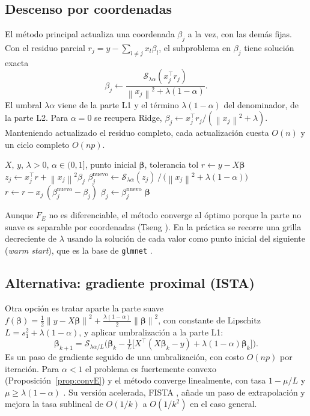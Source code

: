 \documentclass[11pt,a4paper]{article}
\newcommand{\norm}[1]{\left\lVert #1 \right\rVert}
\newcommand{\bt}{\bm{\beta}}
\newcommand{\soft}{\mathcal{S}}
\theoremstyle{simple}
\begin{document}
\subsection{Descenso por coordenadas}
El método principal actualiza una coordenada $\beta_j$ a la vez, con las demás fijas. Con el residuo parcial $r_j=y-\sum_{l\ne j}x_l\beta_l$, el subproblema en $\beta_j$ tiene solución exacta
\begin{equation}\label{eq:cd-enet}
\beta_j\leftarrow\frac{\soft_{\lambda\alpha}(x_j^\top r_j)}{\norm{x_j}^2+\lambda(1-\alpha)} .
\end{equation}
El umbral $\lambda\alpha$ viene de la parte L1 y el término $\lambda(1-\alpha)$ del denominador, de la parte L2. Para $\alpha=0$ se recupera Ridge, $\beta_j\leftarrow x_j^\top r_j/(\norm{x_j}^2+\lambda)$. Manteniendo actualizado el residuo completo, cada actualización cuesta $O(n)$ y un ciclo completo $O(np)$.

\begin{algorithm}[ht]
\caption{Descenso por coordenadas para Elastic Net}\label{alg:cd}
\begin{algorithmic}[1]
\Require $X$, $y$, $\lambda>0$, $\alpha\in(0,1]$, punto inicial $\bt$, tolerancia $\mathrm{tol}$
\State $r\gets y-X\bt$
\Repeat
    \State $z_j\gets x_j^\top r+\norm{x_j}^2\beta_j$
    \State $\beta_j^{\mathrm{nuevo}}\gets\soft_{\lambda\alpha}(z_j)\,/\,\big(\norm{x_j}^2+\lambda(1-\alpha)\big)$
    \State $r\gets r-x_j\,(\beta_j^{\mathrm{nuevo}}-\beta_j)$
    \State $\beta_j\gets\beta_j^{\mathrm{nuevo}}$
  \EndFor
\Until{el cambio máximo en $\bt$ es menor que $\mathrm{tol}$}
\Ensure $\bt$
\end{algorithmic}
\end{algorithm}

Aunque $F_E$ no es diferenciable, el método converge al óptimo porque la parte no suave es separable por coordenadas (Tseng \cite{tseng2001}). En la práctica se recorre una grilla decreciente de $\lambda$ usando la solución de cada valor como punto inicial del siguiente (\emph{warm start}), que es la base de \texttt{glmnet} \cite{friedman2010}.

\subsection{Alternativa: gradiente proximal (ISTA)}
Otra opción es tratar aparte la parte suave $f(\bt)=\tfrac12\norm{y-X\bt}^2+\tfrac{\lambda(1-\alpha)}{2}\norm{\bt}^2$, con constante de Lipschitz $L=s_1^2+\lambda(1-\alpha)$, y aplicar umbralización a la parte L1:
\begin{equation}\label{eq:ista}
\bt_{k+1}=\soft_{\lambda\alpha/L}\!\Big(\bt_k-\tfrac1L\big[X^\top(X\bt_k-y)+\lambda(1-\alpha)\bt_k\big]\Big).
\end{equation}
Es un paso de gradiente seguido de una umbralización, con costo $O(np)$ por iteración. Para $\alpha<1$ el problema es fuertemente convexo (Proposición~\ref{prop:convE}) y el método converge linealmente, con tasa $1-\mu/L$ y $\mu\ge\lambda(1-\alpha)$ \cite{beck2017}. Su versión acelerada, FISTA \cite{beck2009}, añade un paso de extrapolación y mejora la tasa sublineal de $O(1/k)$ a $O(1/k^2)$ en el caso general.
\end{document}
